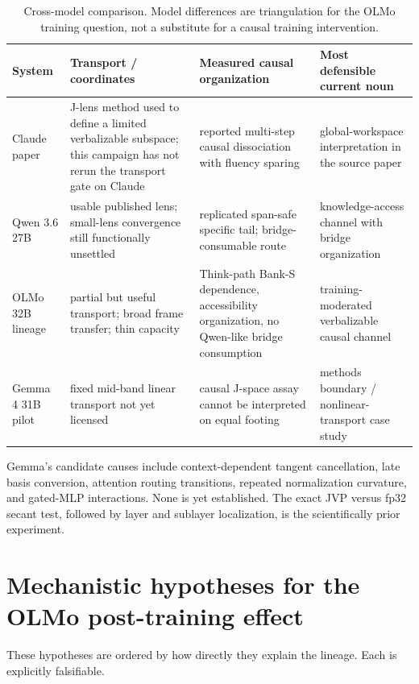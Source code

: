 \documentclass[11pt]{article}
\begin{document}
\begin{table}[H]
\centering\small
\begin{tabularx}{\textwidth}{@{}p{}p{}p{}X@{}}
\toprule
\textbf{System} & \textbf{Transport / coordinates} & \textbf{Measured causal organization} & \textbf{Most defensible current noun}\\
\midrule
Claude paper & J-lens method used to define a limited verbalizable subspace; this campaign has not rerun the transport gate on Claude & reported multi-step causal dissociation with fluency sparing & global-workspace interpretation in the source paper\\
Qwen 3.6 27B & usable published lens; small-lens convergence still functionally unsettled & replicated span-safe specific tail; bridge-consumable route & knowledge-access channel with bridge organization\\
OLMo 32B lineage & partial but useful transport; broad frame transfer; thin capacity & Think-path Bank-S dependence, accessibility organization, no Qwen-like bridge consumption & training-moderated verbalizable causal channel\\
Gemma 4 31B pilot & fixed mid-band linear transport not yet licensed & causal J-space assay cannot be interpreted on equal footing & methods boundary / nonlinear-transport case study\\
\bottomrule
\end{tabularx}
\caption{Cross-model comparison. Model differences are triangulation for the
OLMo training question, not a substitute for a causal training intervention.}
\label{tab:model-comparison}
\end{table}

Gemma's candidate causes include context-dependent tangent cancellation,
late basis conversion, attention routing transitions, repeated normalization
curvature, and gated-MLP interactions. None is yet established. The exact JVP
versus fp32 secant test, followed by layer and sublayer localization, is the
scientifically prior experiment.

\section{Mechanistic hypotheses for the OLMo post-training effect}\label{sec:hypotheses}

These hypotheses are ordered by how directly they explain the lineage. Each
is explicitly falsifiable.
\end{document}
